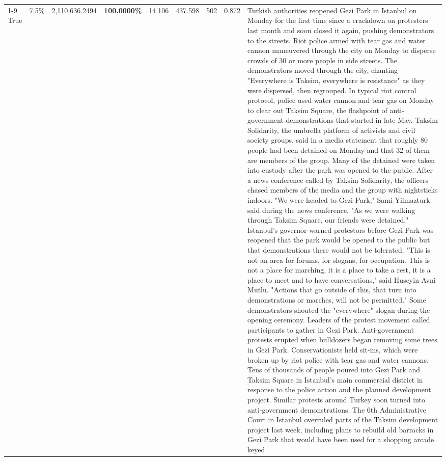 \begin{table}[H]
\begin{tabular}{lllrlllll}
\cline{1-9}
True & 7.5\% & 2,110,636.2494 & \bfseries \color{red} 100.0000\% & 14.106 & 437.598 & 502 & 0.872 & Turkish authorities reopened Gezi Park in Istanbul on Monday for the first time since a crackdown on protesters last month and soon closed it again, pushing demonstrators to the streets. Riot police armed with tear gas and water cannon maneuvered through the city on Monday to disperse crowds of 30 or more people in side streets. The demonstrators moved through the city, chanting "Everywhere is Taksim, everywhere is resistance" as they were dispersed, then regrouped. In typical riot control protocol, police used water cannon and tear gas on Monday to clear out Taksim Square, the flashpoint of anti-government demonstrations that started in late May. Taksim Solidarity, the umbrella platform of activists and civil society groups, said in a media statement that roughly 80 people had been detained on Monday and that 32 of them are members of the group. Many of the detained were taken into custody after the park was opened to the public. After a news conference called by Taksim Solidarity, the officers chased members of the media and the group with nightsticks indoors. "We were headed to Gezi Park," Sami Yilmazturk said during the news conference. "As we were walking through Taksim Square, our friends were detained." Istanbul's governor warned protestors before Gezi Park was reopened that the park would be opened to the public but that demonstrations there would not be tolerated. "This is not an area for forums, for slogans, for occupation. This is not a place for marching, it is a place to take a rest, it is a place to meet and to have conversations," said Huseyin Avni Mutlu. "Actions that go outside of this, that turn into demonstrations or marches, will not be permitted." Some demonstrators shouted the "everywhere" slogan during the opening ceremony. Leaders of the protest movement called participants to gather in Gezi Park. Anti-government protests erupted when bulldozers began removing some trees in Gezi Park. Conservationists held sit-ins, which were broken up by riot police with tear gas and water cannons. Tens of thousands of people poured into Gezi Park and Taksim Square in Istanbul's main commercial district in response to the police action and the planned development project. Similar protests around Turkey soon turned into anti-government demonstrations. The 6th Administrative Court in Istanbul overruled parts of the Taksim development project last week, including plans to rebuild old barracks in Gezi Park that would have been used for a shopping arcade. keyed \\

\end{tabular}
\end{table}
